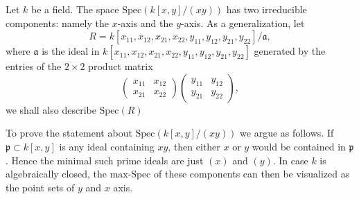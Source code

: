 \begin{example}
\label{example-product-matrixes-zero}
Let $k$ be a field. The space $\text{Spec}(k[x,y]/(xy))$
has two irreducible components: namely the $x$-axis and the
$y$-axis. As a generalization, let
$$
R = k[x_{11},x_{12},x_{21},x_{22},y_{11},y_{12},y_{21},y_{22}]/\mathfrak a,
$$ where $\mathfrak a$ is the ideal in
$k[x_{11},x_{12},x_{21},x_{22},y_{11},y_{12},y_{21},y_{22}]$
generated by the entries of the $2 \times 2$ product matrix
$$
\left(
\begin{matrix}
x_{11} & x_{12}\\
x_{21} & x_{22}
\end{matrix}
\right)
 \left(
\begin{matrix}
y_{11} & y_{12}\\
y_{21} & y_{22}
\end{matrix}
\right),
$$
we shall also describe $\text{Spec}(R)$

\medskip\noindent
To prove the statement about $\text{Spec}(k[x,y]/(xy))$ we argue as follows.
If $\mathfrak p \subset k[x, y]$ is any ideal containing $xy$, then either
$x$ or $y$ would be contained in $\mathfrak p$. Hence the minimal such
prime ideals are just $(x)$ and $(y)$. In case $k$ is
algebraically closed, the $\text{max-Spec}$ of these components
can then be visualized as the point sets of $y$ and $x$ axis.


\end{example}
